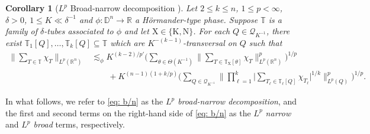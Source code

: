 \documentclass[reqno]{amsart}
\numberwithin{equation}{section}
\newcommand{\D}{\mathbb{D}}
\newcommand{\R}{\mathbb{R}}
\newcommand{\T}{\mathbb{T}}
\newcommand{\cQ}{\mathcal{Q}}
\theoremstyle{plain}
\newtheorem{corollary}[theorem]{Corollary}
\theoremstyle{definition}
\begin{document}
\begin{corollary}[$L^p$ Broad-narrow decomposition \cite{BG2011}]\label{cor: b/n} Let $2 \leq k \leq n$, $1 \leq p < \infty$, $\delta > 0$, $1 \leq K \ll \delta^{-1}$ and $\phi \colon \D^n \to \R$ a H\"ormander-type phase. Suppose $\T$ is a family of $\delta$-tubes associated to $\phi$ and let $\mathrm{X} \in \{\mathrm{K}, \mathrm{N}\}$. For each $Q \in \cQ_{K^{-1}}$, there exist $\T_1[Q], \dots, \T_k[Q] \subseteq \T$ which are  $K^{-(k-1)}$-transversal on $Q$ such that
\begin{align}\label{eq: b/n}
   \big\|\sum_{T \in \T} \chi_T\big\|_{L^p(\R^n)} &\lesssim_\phi K^{(k-2)/p'}\Big(\sum_{\theta \in \Theta(K^{-1})} \big\|\sum_{T \in \T_{\mathrm{X}}[\theta]} \chi_T\big\|_{L^p(\R^n)}^p \Big)^{1/p} \\
   \nonumber\textbf{}
   & \qquad + K^{(n-1)(1 + k/p)} \Big(\sum_{Q \in \cQ_{K^{-1}}}  \Big\| \prod_{\ell = 1}^k \big|\sum_{T_{\ell} \in \T_{\ell}[Q]} \chi_{T_{\ell}}\big|^{1/k}\Big\|_{L^p(Q)}^p \Big)^{1/p}.
\end{align}
\end{corollary}

In what follows, we refer to \eqref{eq: b/n} as the \textit{$L^p$ broad-narrow decomposition}, and the first and second terms on the right-hand side of \eqref{eq: b/n} as the \textit{$L^p$ narrow} and \textit{$L^p$ broad} terms, respectively. 
\end{document}
